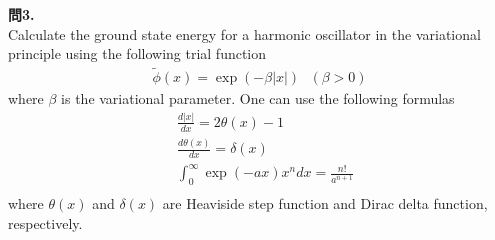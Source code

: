 \documentclass{jlreq}
\begin{document}
\clearpage

\noindent
\textbf{問3.}\\

\noindent
Calculate the ground state energy for a harmonic oscillator in the variational principle using the following trial function
\begin{eqnarray}
    \tilde{\phi}(x)=\exp(-\beta|x|) \ \ \ (\beta>0)
\end{eqnarray}  
where $\beta$ is the variational parameter. One can use the following formulas
\begin{eqnarray}
    &\frac{d|x|}{dx}=2\theta(x)-1 \\
    &\frac{d\theta(x)}{dx}=\delta(x) \\
    &\int_0^\infty \exp(-ax)x^n dx=\frac{n!}{a^{n+1}} \\
\end{eqnarray}  
where $\theta(x)$ and $\delta(x)$ are Heaviside step function and Dirac delta function, respectively.\\

\end{document}
